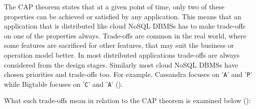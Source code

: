 The CAP theorem states that at a given point of time,   only two of these
properties can be achieved or satisfied by any application.  This means that an
application that is distributed like cloud \ac{NoSQL} \acp{DBMS} has to make
trade-offs on one of the properties always.  Trade-offs are common in the real
world,   where some features are sacrificed for other features,   that may suit
the business or operation model better.  In most distributed applications
trade-offs are always considered from the design stages.   Similarly most cloud
\ac{NoSQL} \acp{DBMS} have chosen priorities and trade-offs too.  For example,  
Cassandra focuses on '\texttt{A}' and '\texttt{P}' while Bigtable focuses on
'\texttt{C}' and '\texttt{A}' ().

What such trade-offs mean in relation to the CAP theorem is examined below
():

